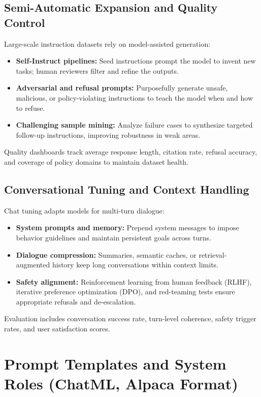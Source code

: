 \documentclass{article}
\begin{document}
\subsection{Semi-Automatic Expansion and Quality Control}
Large-scale instruction datasets rely on model-assisted generation:
\begin{itemize}
  \item \textbf{Self-Instruct pipelines:} Seed instructions prompt the model to invent new tasks; human reviewers filter and refine the outputs.
  \item \textbf{Adversarial and refusal prompts:} Purposefully generate unsafe, malicious, or policy-violating instructions to teach the model when and how to refuse.
  \item \textbf{Challenging sample mining:} Analyze failure cases to synthesize targeted follow-up instructions, improving robustness in weak areas.
\end{itemize}
Quality dashboards track average response length, citation rate, refusal accuracy, and coverage of policy domains to maintain dataset health.

\subsection{Conversational Tuning and Context Handling}
Chat tuning adapts models for multi-turn dialogue:
\begin{itemize}
  \item \textbf{System prompts and memory:} Prepend system messages to impose behavior guidelines and maintain persistent goals across turns.
  \item \textbf{Dialogue compression:} Summaries, semantic caches, or retrieval-augmented history keep long conversations within context limits.
  \item \textbf{Safety alignment:} Reinforcement learning from human feedback (RLHF), iterative preference optimization (DPO), and red-teaming tests ensure appropriate refusals and de-escalation.
\end{itemize}
Evaluation includes conversation success rate, turn-level coherence, safety trigger rates, and user satisfaction scores.

\section{Prompt Templates and System Roles (ChatML, Alpaca Format)}
\end{document}
